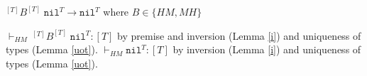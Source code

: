 \begin{case}
$^{[T]}B^{[T]}\;\mathtt{nil}^{T}\rightarrow\mathtt{nil}^{T}$ where $B\in\lbrace HM,MH\rbrace$

$\vdash_{HM}\,^{[T]}B^{[T]}\;\mathtt{nil}^{T}:[T]$ by premise and inversion (Lemma \ref{i}) and uniqueness of types (Lemma \ref{uot}).  $\vdash_{HM}\mathtt{nil}^{T}:[T]$ by inversion (Lemma \ref{i}) and uniqueness of types (Lemma \ref{uot}).
\end{case}